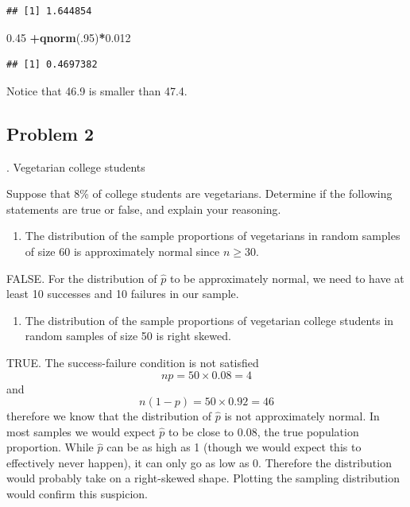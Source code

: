 \documentclass[
]{book}
\newenvironment{Shaded}{\begin{snugshade}}{\end{snugshade}}
\newcommand{\DecValTok}[1]{\textcolor[rgb]{0.00,0.00,0.81}{#1}}
\newcommand{\FloatTok}[1]{\textcolor[rgb]{0.00,0.00,0.81}{#1}}
\newcommand{\KeywordTok}[1]{\textcolor[rgb]{0.13,0.29,0.53}{\textbf{#1}}}
\newcommand{\NormalTok}[1]{#1}
\newcommand{\OperatorTok}[1]{\textcolor[rgb]{0.81,0.36,0.00}{\textbf{#1}}}
\providecommand{\tightlist}{%
  \setlength{\itemsep}{0pt}\setlength{\parskip}{0pt}}
\begin{document}
\begin{verbatim}
## [1] 1.644854
\end{verbatim}

\begin{Shaded}
\begin{Highlighting}[]
\FloatTok{0.45} \OperatorTok{+}\KeywordTok{qnorm}\NormalTok{(.}\DecValTok{95}\NormalTok{)}\OperatorTok{*}\FloatTok{0.012}
\end{Highlighting}
\end{Shaded}

\begin{verbatim}
## [1] 0.4697382
\end{verbatim}

Notice that 46.9 is smaller than 47.4.

\pagebreak

\hypertarget{problem-2-21}{%
\subsection{Problem 2}\label{problem-2-21}}

. Vegetarian college students

Suppose that 8\% of college students are vegetarians. Determine if the following statements are true or false, and explain your reasoning.

\begin{enumerate}
\def\labelenumi{\alph{enumi}.}
\tightlist
\item
  The distribution of the sample proportions of vegetarians in random samples of size 60 is approximately normal since \(n \ge 30\).
\end{enumerate}

FALSE. For the distribution of \(\hat{p}\) to be approximately normal, we need to have at least
10 successes and 10 failures in our sample.

\begin{enumerate}
\def\labelenumi{\alph{enumi}.}
\setcounter{enumi}{1}
\tightlist
\item
  The distribution of the sample proportions of vegetarian college students in random samples of size 50 is right skewed.
\end{enumerate}

TRUE. The success-failure condition is not satisfied
\[np = 50 \times 0.08 = 4\] and
\[n(1 - p) = 50 \times 0.92 = 46\]
therefore we know that the distribution of \(\hat{p}\) is not approximately normal. In most samples we would expect \(\hat{p}\) to be close to 0.08, the true population proportion. While \(\hat{p}\) can be as high as 1 (though we would expect this to effectively never happen), it can only go as low as 0. Therefore the distribution would probably take on a right-skewed shape. Plotting the sampling distribution would confirm this suspicion.
\end{document}
